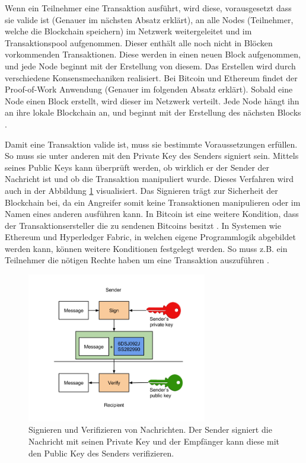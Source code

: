 Wenn ein Teilnehmer eine Transaktion ausführt, wird diese, vorausgesetzt dass sie valide ist (Genauer im nächsten Absatz erklärt), an alle Nodes (Teilnehmer, welche die Blockchain speichern) im Netzwerk weitergeleitet und im Transaktionspool aufgenommen. Dieser enthält alle noch nicht in Blöcken vorkommenden Transaktionen. Diese werden in einen neuen Block aufgenommen, und jede Node beginnt mit der Erstellung von diesem. Das Erstellen wird durch verschiedene Konsensmechaniken realisiert. Bei Bitcoin und Ethereum findet der Proof-of-Work Anwendung (Genauer im folgenden Absatz erklärt). Sobald eine Node einen Block erstellt, wird dieser im Netzwerk verteilt. Jede Node hängt ihn an ihre lokale Blockchain an, und beginnt mit der Erstellung des nächsten Blocks \cite{MAntonopoulosMasteringbitcoin2015}.

Damit eine Transaktion valide ist, muss sie bestimmte Voraussetzungen erfüllen. So muss sie unter anderen mit den Private Key des Senders signiert sein. Mittels seines Public Keys kann überprüft werden, ob wirklich er der Sender der Nachricht ist und ob die Transaktion manipuliert wurde. Dieses Verfahren wird auch in der Abbildung \ref{fig:key-signing} visualisiert. Das Signieren trägt zur Sicherheit der Blockchain bei, da ein Angreifer somit keine Transaktionen manipulieren oder im Namen eines anderen ausführen kann. In Bitcoin ist eine weitere Kondition, dass der Transaktionsersteller die zu sendenen Bitcoins besitzt \cite{AntonopoulosMasteringbitcoin2015}. In Systemen wie Ethereum und Hyperledger Fabric, in welchen eigene Programmlogik abgebildet werden kann, können weitere Konditionen festgelegt werden. So muss z.B. ein Teilnehmer die nötigen Rechte haben um eine Transaktion auszuführen \cite{AccessControlLanguage}.

\begin{figure}[htb]
	\centering
	  \includegraphics[width=0.7\textwidth,angle=0]{images/key-signing}
	  \caption{Signieren und Verifizieren von Nachrichten. Der Sender signiert die Nachricht mit seinen Private Key und der Empfänger kann diese mit den Public Key des Senders verifizieren.}
	  \label{fig:key-signing}
\end{figure}
	

